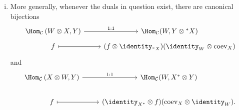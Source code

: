 \begin{proposition}
\begin{enumerate}[(i)]
		\begin{equation*}\begin{aligned}
			\begin{tikzpicture}[baseline=(M)]
				\node (A) {$X$};
				\node (B) [below=of A]{$Y$};
				\path (A) edge[->] node[midway, draw, fill=white] {$f$} (B);
				\coordinate (M) at ($(A)!.5!(B)$);
			\end{tikzpicture}
			& \; \longmapsto \; \begin{tikzpicture}[baseline=(B), bend angle=70]
				\node (A) {$X$};
				\node (B) [left=of A] {$X^*$};
				\node (C) [below=of A] {$Y$};
				\node (D) [below=of B] {$X^*$};
				\path (B) edge[bend left] node[auto] {$\mathrm{coev}_X$} (A);
				\path (A) edge[->] node[midway, draw, fill=white] {$f$} (C);
				\path (B) edge (D);
			\end{tikzpicture}
			\\
			\begin{tikzpicture}[baseline=(D), bend angle=70]
				\node (B) {$X$};
				\node (C) [right=of B] {$X^*$};
				\node (D) [right=of C] {$Y$};
				\node (A) [below=of D] {$Y$};
				\path (D) edge[->] (A);
				\path (B) edge[bend right] node[auto] {$\mathrm{ev}_X$} (C);
				\path (C) edge[bend left] node[midway, draw, fill=white] {$\varphi$} (D);
			\end{tikzpicture}
			& \; \longmapsfrom \;
			\begin{tikzpicture}[baseline=(A), bend angle=70]
				\node (A) {$X^*$};
				\node (B) [right=of A] {$Y$};
				\path (A) edge[bend left] node[midway, draw, fill=white] {$\varphi$} (B);
			\end{tikzpicture}
		\end{aligned}\end{equation*}
		\item More generally, whenever the duals in question exist, there are canonical bijections
		\[\begin{tikzcd}[row sep=tiny]
			\Hom_{\mathcal{C}}\left( W \otimes X, Y \right) \arrow[r, "1:1"] & \Hom_{\mathcal{C}}(W, Y \otimes {}^* X) \\
			f \arrow[mapsto, r] & (f \otimes \identity_{{}^* X}) (\identity_W \otimes \mathrm{coev}_X)
		\end{tikzcd}\]
		and
		\[\begin{tikzcd}
			\Hom_{\mathcal{C}}\left( X \otimes W, Y \right) \arrow[r, "1:1"] & \Hom_{\mathcal{C}}(W, X^* \otimes Y) \\
			f \arrow[mapsto, r] & (\identity_{X^*} \otimes f) (\mathrm{coev}_X \otimes \identity_W).
		\end{tikzcd}\]
	\end{enumerate}
\end{proposition}
